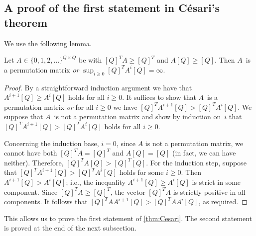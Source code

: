 \subsection{A proof of the first statement in C{\'{e}}sari's theorem}

We use the following lemma.
\begin{lem} \label{lem:Cesari-lemma}
Let $A \in \{0, 1, 2, \ldots\}^{Q \times Q}$ be with $[Q]^T A \ge [Q]^T$ and $A [Q] \ge [Q]$.
Then $A$~is a permutation matrix \emph{or} $\sup_{i \ge 0} [Q]^T A^i [Q] = \infty$.
\end{lem}
\begin{proof}
By a straightforward induction argument we have that $A^{i+1} [Q] \ge A^i [Q]$ holds for all $i \ge 0$.
It suffices to show that $A$~is a permutation matrix \emph{or} for all $i \ge 0$ we have $[Q]^T A^{i+1} [Q] > [Q]^T A^i [Q]$.
We suppose that $A$~is not a permutation matrix and show by induction on~$i$ that $[Q]^T A^{i+1} [Q] > [Q]^T A^i [Q]$ holds for all $i \ge 0$.

Concerning the induction base, $i=0$, since $A$ is not a permutation matrix, we cannot have both $[Q]^T A = [Q]^T$ and $A [Q] = [Q]$ (in fact, we can have neither).
Therefore, $[Q]^T A [Q] > [Q]^T [Q]$.
For the induction step, suppose that $[Q]^T A^{i+1} [Q] > [Q]^T A^i [Q]$ holds for some $i \ge 0$.
Then $A^{i+1} [Q] > A^i [Q]$; i.e., the inequality $A^{i+1} [Q] \ge A^i [Q]$ is strict in some component.
Since $[Q]^T A \ge [Q]^T$, the vector $[Q]^T A$ is strictly positive in all components.
It follows that $[Q]^T A A^{i+1} [Q] > [Q]^T A A^i [Q]$, as required.
\end{proof}

\noindent
This allows us to prove the first statement of \autoref{thm:Cesari}. The second statement is proved at the end of the next subsection.

